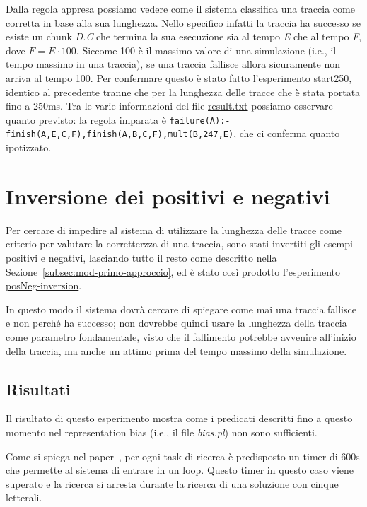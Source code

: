 Dalla regola appresa possiamo vedere come il sistema classifica una traccia come corretta in base alla sua lunghezza. Nello specifico infatti la traccia ha successo se esiste un chunk \textit{D.C} che termina la sua esecuzione sia al tempo \textit{E} che al tempo \textit{F}, dove $F=E\cdot100$. Siccome 100 è il massimo valore di una simulazione (i.e., il tempo massimo in una traccia), se una traccia fallisce allora sicuramente non arriva al tempo 100. Per confermare questo è stato fatto l'esperimento \href{https://github.com/edoardosarri24/numsynth/tree/main/my-experiments/2-start250/}{start250}, identico al precedente tranne che per la lunghezza delle tracce che è stata portata fino a 250ms. Tra le varie informazioni del file \href{https://github.com/edoardosarri24/numsynth/tree/main/my-experiments/2-start250/result.txt}{result.txt} possiamo osservare quanto previsto: la regola imparata è \texttt{failure(A):- finish(A,E,C,F),finish(A,B,C,F),mult(B,247,E)}, che ci conferma quanto ipotizzato.

\section{Inversione dei positivi e negativi}
Per cercare di impedire al sistema di utilizzare la lunghezza delle tracce come criterio per valutare la corretterzza di una traccia, sono stati invertiti gli esempi positivi e negativi, lasciando tutto il resto come descritto nella Sezione~\ref{subsec:mod-primo-approccio}, ed è stato così prodotto l'esperimento \href{https://github.com/edoardosarri24/numsynth/tree/main/my-experiments/3-posNeg-inversion}{posNeg-inversion}.

In questo modo il sistema dovrà cercare di spiegare come mai una traccia fallisce e non perché ha successo; non dovrebbe quindi usare la lunghezza della traccia come parametro fondamentale, visto che il fallimento potrebbe avvenire all'inizio della traccia, ma anche un attimo prima del tempo massimo della simulazione.

\subsection{Risultati}
Il risultato di questo esperimento mostra come i predicati descritti fino a questo momento nel representation bias (i.e., il file \textit{bias.pl}) non sono sufficienti.

Come si spiega nel paper~\cite{numsynth}, per ogni task di ricerca è predisposto un timer di 600s che permette al sistema di entrare in un loop. Questo timer in questo caso viene superato e la ricerca si arresta durante la ricerca di una soluzione con cinque letterali.

